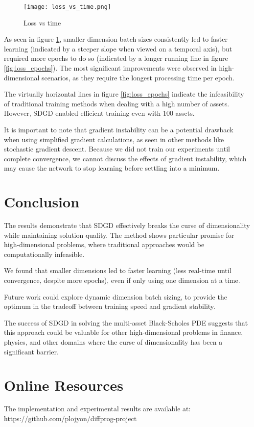 \documentclass[manuscript,screen,review,acmtog]{acmart}
\begin{document}
\begin{figure}
    \centering
    \texttt{[image: loss\_vs\_time.png]}
    \caption{Loss vs time}
    \label{fig:loss_time}
\end{figure}

As seen in figure \ref{fig:loss_time}, smaller dimension batch sizes consistently led to faster learning (indicated by a steeper slope when viewed on a temporal axis), but required more epochs to do so (indicated by a longer running line in figure \ref{fig:loss_epochs}). The most significant improvements were observed in high-dimensional scenarios, as they require the longest processing time per epoch.

The virtually horizontal lines in figure \ref{fig:loss_epochs} indicate the infeasibility of traditional training methods when dealing with a high number of assets. However, SDGD enabled efficient training even with 100 assets.

It is important to note that gradient instability can be a potential drawback when using simplified gradient calculations, as seen in other methods like stochastic gradient descent. Because we did not train our experiments until complete convergence, we cannot discuss the effects of gradient instability, which may cause the network to stop learning before settling into a minimum.

\section{Conclusion}
The results demonstrate that SDGD effectively breaks the curse of dimensionality while maintaining solution quality. The method shows particular promise for high-dimensional problems, where traditional approaches would be computationally infeasible.

We found that smaller dimensions led to faster learning (less real-time until convergence, despite more epochs), even if only using one dimension at a time.

Future work could explore dynamic dimension batch sizing, to provide the optimum in the tradeoff between training speed and gradient stability.

The success of SDGD in solving the multi-asset Black-Scholes PDE suggests that this approach could be valuable for other high-dimensional problems in finance, physics, and other domains where the curse of dimensionality has been a significant barrier.




\appendix

\section{Online Resources}
The implementation and experimental results are available at:\\
https://github.com/plojyon/diffprog-project
\end{document}
